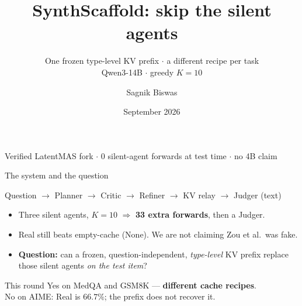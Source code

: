 \documentclass[aspectratio=169]{beamer}
\title{SynthScaffold: skip the silent agents}
\subtitle{One frozen type-level KV prefix $\cdot$ a different recipe per task\\
Qwen3-14B $\cdot$ greedy $K{=}10$}
\author{Sagnik Biswas}
\date{September 2026}
\begin{document}
\begin{frame}
\titlepage
\begin{center}\small
Verified LatentMAS fork $\cdot$ 0 silent-agent forwards at test time $\cdot$ no 4B claim
\end{center}
\end{frame}

\begin{frame}{The system and the question}
\begin{center}
\small Question $\to$ Planner $\to$ Critic $\to$ Refiner $\to$ KV relay $\to$ Judger (text)
\end{center}
\begin{itemize}
  \item Three silent agents, $K{=}10$ $\Rightarrow$ \textbf{33 extra forwards}, then a Judger.
  \item Real still beats empty-cache (None). We are not claiming Zou et al.\ was fake.
  \item \textbf{Question:} can a frozen, question-independent, \emph{type-level} KV prefix
        replace those silent agents \emph{on the test item}?
\end{itemize}
\begin{block}{This round}
Yes on MedQA and GSM8K --- \textbf{different cache recipes}.\\
No on AIME: Real is $66.7\%$; the prefix does not recover it.
\end{block}
\end{frame}
\end{document}
